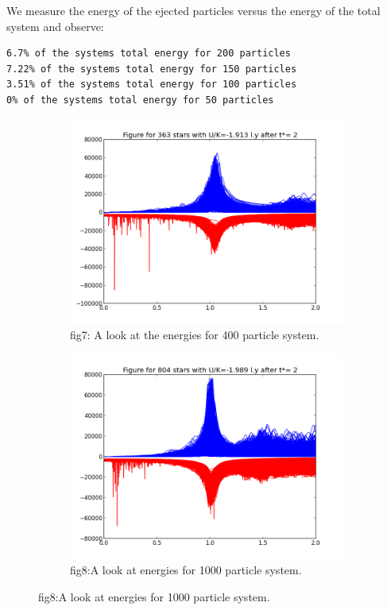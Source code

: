 \documentclass{article}
\begin{document}
We measure the energy of the ejected particles versus the energy of the
total system and observe:
\begin{verbatim}
6.7% of the systems total energy for 200 particles 
7.22% of the systems total energy for 150 particles
3.51% of the systems total energy for 100 particles
0% of the systems total energy for 50 particles
\end{verbatim}
\newpage
\begin{figure}
\centering
\begin{subfigure}{.65\textwidth}
  \centering
  \hspace{-6cm}
  \includegraphics[scale=0.45]{f1-400.png}
  \caption{fig7: A look at the energies for 400 particle system.}
  \hspace{-6cm}
  \label{fig:sub1}
\end{subfigure}%
\begin{subfigure}{.65\textwidth}
  \hspace{-5cm}
  \centering
  \includegraphics[scale=0.45]{f1-1000.png}
  \caption{fig8:A look at energies for 1000 particle system.}
  \label{fig:sub2}
\end{subfigure}
\label{fig:test}

\end{figure}
\end{document}
